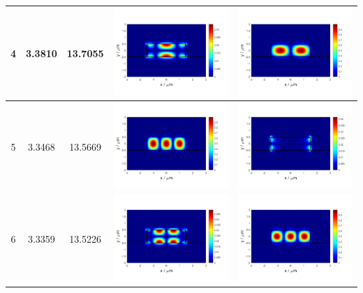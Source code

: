 \documentclass{assignment}
\begin{document}
\begin{sol}
\begin{itemize}
\begin{longtable}[c]{|c|c|c|c|c|}
            4 & 3.3810 & 13.7055 & \includegraphics[width=.3\columnwidth]{Assignment-2-mode-4-Ex.png} & \includegraphics[width=.3\columnwidth]{Assignment-2-mode-4-Ey.png} \\ \hline
            5 & 3.3468 & 13.5669 & \includegraphics[width=.3\columnwidth]{Assignment-2-mode-5-Ex.png} & \includegraphics[width=.3\columnwidth]{Assignment-2-mode-5-Ey.png} \\ \hline
            6 & 3.3359 & 13.5226 & \includegraphics[width=.3\columnwidth]{Assignment-2-mode-6-Ex.png} & \includegraphics[width=.3\columnwidth]{Assignment-2-mode-6-Ey.png} \\ \hline

\end{longtable}
\end{itemize}
\end{sol}
\end{document}

